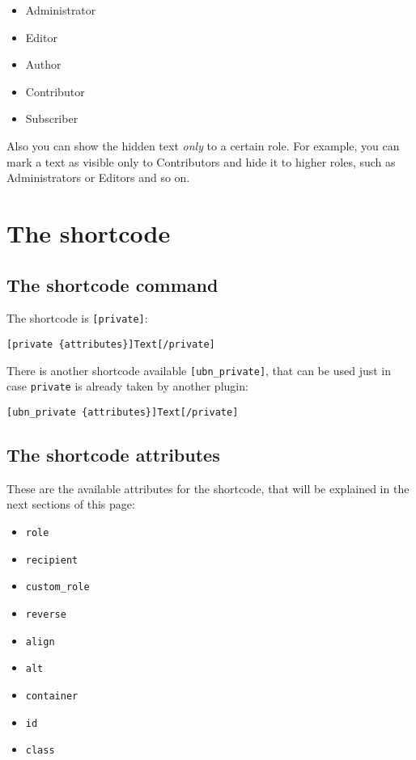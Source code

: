 \begin{itemize}
	\item Administrator
	\item Editor
	\item Author
	\item Contributor
	\item Subscriber
\end{itemize}

Also you can show the hidden text \textit{only} to a certain role. For example,
you can mark a text as visible only to Contributors and hide it to higher roles,
such as Administrators or Editors and so on.

\part{The shortcode}

\chapter{The shortcode command}

The shortcode is \verb+[private]+:

\begin{lstlisting}
[private {attributes}]Text[/private]
\end{lstlisting}

There is another shortcode available \verb+[ubn_private]+, that can be used just
in case \verb+private+ is already taken by another plugin:

\begin{lstlisting}
[ubn_private {attributes}]Text[/private]
\end{lstlisting}

\chapter{The shortcode attributes}

These are the available attributes for the shortcode, that will be explained in
the next sections of this page:

\begin{itemize}
 \item \verb+role+
 \item \verb+recipient+
 \item \verb+custom_role+
 \item \verb+reverse+
 \item \verb+align+
 \item \verb+alt+
 \item \verb+container+
 \item \verb+id+
 \item \verb+class+
\end{itemize}


